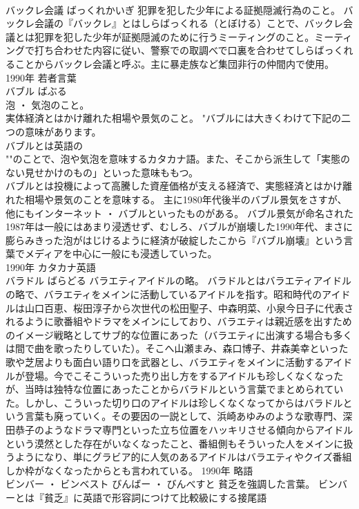\documentclass[8pt]{extreport}
\begin{document}
\begin{CJK}{UTF8}{min}
\\	バックレ会議	ばっくれかいぎ	犯罪を犯した少年による証拠隠滅行為のこと。	バックレ会議の『バックレ』とはしらばっくれる（とぼける）ことで、バックレ会議とは犯罪を犯した少年が証拠隠滅のために行うミーティングのこと。ミーティングで打ち合わせた内容に従い、警察での取調べで口裏を合わせてしらばっくれることからバックレ会議と呼ぶ。主に暴走族など集団非行の仲間内で使用。	1990年	若者言葉	
\\	バブル	ばぶる	
\\	泡 ・ 気泡のこと。 
\\	実体経済とはかけ離れた相場や景気のこと。	"バブルには大きくわけて下記の二つの意味があります。 
\\	バブルとは英語の
\\	""のことで、泡や気泡を意味するカタカナ語。また、そこから派生して「実態のない見せかけのもの」といった意味ももつ。 
\\	バブルとは投機によって高騰した資産価格が支える経済で、実態経済とはかけ離れた相場や景気のことを意味する。 主に1980年代後半のバブル景気をさすが、他にもインターネット ・ バブルといったものがある。 バブル景気が命名された1987年は一般にはあまり浸透せず、むしろ、バブルが崩壊した1990年代、まさに膨らみきった泡がはじけるように経済が破綻したこから『バブル崩壊』という言葉でメディアを中心に一般にも浸透していった。
\\	1990年	カタカナ英語	
\\	バラドル	ばらどる	バラエティアイドルの略。	バラドルとはバラエティアイドルの略で、バラエティをメインに活動しているアイドルを指す。昭和時代のアイドルは山口百恵、桜田淳子から次世代の松田聖子、中森明菜、小泉今日子に代表されるように歌番組やドラマをメインにしており、バラエティは親近感を出すためのイメージ戦略としてサブ的な位置にあった（バラエティに出演する場合も多くは間で曲を歌ったりしていた）。そこへ山瀬まみ、森口博子、井森美幸といった歌や芝居よりも面白い語り口を武器とし、バラエティをメインに活動するアイドルが登場。今でこそこういった売り出し方をするアイドルも珍しくなくなったが、当時は独特な位置にあったことからバラドルという言葉でまとめられていた。しかし、こういった切り口のアイドルは珍しくなくなってからはバラドルという言葉も廃っていく。その要因の一説として、浜崎あゆみのような歌専門、深田恭子のようなドラマ専門といった立ち位置をハッキリさせる傾向からアイドルという漠然とした存在がいなくなったこと、番組側もそういった人をメインに扱うようになり、単にグラビア的に人気のあるアイドルはバラエティやクイズ番組しか枠がなくなったからとも言われている。	1990年	略語	
\\	ビンバー ・ ビンベスト	びんばー ・ びんべすと	貧乏を強調した言葉。	ビンバーとは『貧乏』に英語で形容詞につけて比較級にする接尾語

\end{CJK}
\end{document}
